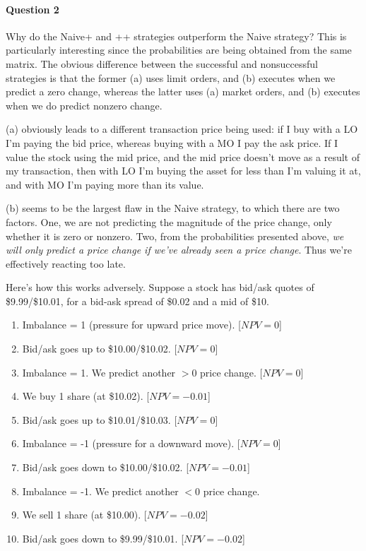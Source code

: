 \paragraph{Question 2} Why do the Naive+ and ++ strategies outperform the Naive strategy? This is particularly interesting since the probabilities are being obtained from the same matrix. The obvious difference between the successful and nonsuccessful strategies is that the former (a) uses limit orders, and (b) executes when we predict a zero change, whereas the latter uses (a) market orders, and (b) executes when we do predict nonzero change.

(a) obviously leads to a different transaction price being used: if I buy with a LO I'm paying the bid price, whereas buying with a MO I pay the ask price. If I value the stock using the mid price, and the mid price doesn't move as a result of my transaction, then with LO I'm buying the asset for less than I'm valuing it at, and with MO I'm paying more than its value.

(b) seems to be the largest flaw in the Naive strategy, to which there are two factors. One, we are not predicting the magnitude of the price change, only whether it is zero or nonzero. Two, from the probabilities presented above, \textit{we will only predict a price change if we've already seen a price change}. Thus we're effectively reacting too late. 

Here's how this works adversely. Suppose a stock has bid/ask quotes of \$9.99/\$10.01, for a bid-ask spread of \$0.02 and a mid of \$10.

\begin{enumerate}
\item Imbalance = 1 (pressure for upward price move). [$NPV = 0$]
\item Bid/ask goes up to \$10.00/\$10.02. [$NPV = 0$]
\item Imbalance = 1. We predict another $>0$ price change. [$NPV = 0$]
\item We buy 1 share (at \$10.02). [$NPV = -0.01$]
\item Bid/ask goes up to \$10.01/\$10.03. [$NPV = 0$]
\item Imbalance = -1 (pressure for a downward move). [$NPV = 0$]
\item Bid/ask goes down to \$10.00/\$10.02. [$NPV = -0.01$]
\item Imbalance = -1. We predict another $<0$ price change. 
\item We sell 1 share (at \$10.00). [$NPV = -0.02$]
\item Bid/ask goes down to \$9.99/\$10.01. [$NPV = -0.02$]
\end{enumerate}

